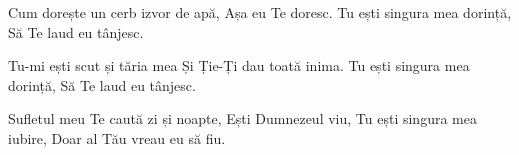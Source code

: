

\beginverse
Cum dorește un cerb izvor de apă,
Așa eu Te doresc.
Tu ești singura mea dorință,
Să Te laud eu tânjesc.
\endverse

\beginchorus
Tu-mi ești scut și tăria mea
Și Ție-Ți dau toată inima.
Tu ești singura mea dorință,
Să Te laud eu tânjesc.
\endchorus

\beginverse
Sufletul meu Te caută zi și noapte,
Ești Dumnezeul viu,
Tu ești singura mea iubire,
Doar al Tău vreau eu să fiu.
\endverse

\endsong
